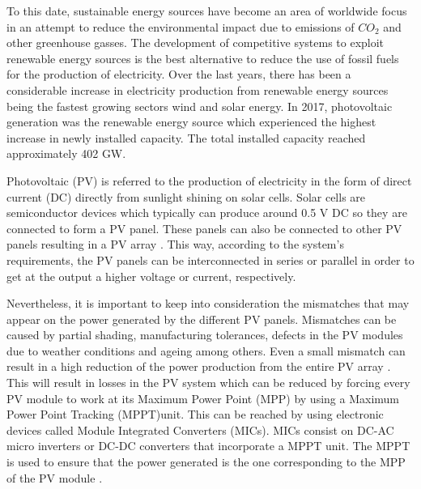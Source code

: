 To this date, sustainable energy sources have become an area of worldwide focus in an attempt to reduce the environmental impact due to emissions of $CO_{2}$ and other greenhouse gasses. The development of competitive systems to exploit renewable energy sources is the best alternative to reduce the use of fossil fuels for the production of electricity. Over the last years, there has been a considerable increase in electricity production from renewable energy sources being the fastest growing sectors wind and solar energy. In 2017, photovoltaic generation was the renewable energy source which experienced the highest increase in newly installed capacity. The total installed capacity reached approximately 402 GW\cite{global}. 

Photovoltaic (PV) is referred to the production of electricity in the form of direct current (DC) directly from sunlight shining on solar cells. Solar cells are semiconductor devices which typically can produce around 0.5 V DC so they are connected to form a PV panel. These panels can also be connected to other PV panels resulting in a PV array \cite{handbook}. This way, according to the system's requirements, the PV panels can be interconnected in series or parallel in order to get at the output a higher voltage or current, respectively.

Nevertheless, it is important to keep into consideration the mismatches that may appear on the power generated by the different PV panels.  Mismatches can be caused by partial shading, manufacturing tolerances, defects in the PV modules due to weather conditions and ageing among others. Even a small mismatch can result in a high reduction of the power production from the entire PV array \cite{MPPmismatch}. This will result in losses in the PV system which can be reduced by forcing every PV module to work at its Maximum Power Point (MPP) by using a Maximum Power Point Tracking (MPPT)unit. This can be reached by using electronic devices called Module Integrated Converters (MICs). MICs consist on DC-AC micro inverters or DC-DC converters that incorporate a MPPT unit. The MPPT is used to ensure that the power generated is the one corresponding to the MPP of the PV module \cite{MPPmismatch}.